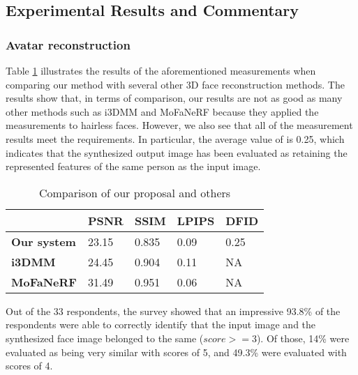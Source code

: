 \subsection{Experimental Results and Commentary}
\subsubsection{Avatar reconstruction}

Table \ref{loss_stats} illustrates the results of the aforementioned measurements when comparing our method with several other 3D face reconstruction methods. The results show that, in terms of comparison, our results are not as good as many other methods such as i3DMM and MoFaNeRF because they applied the measurements to hairless faces. However, we also see that all of the measurement results meet the requirements. In particular, the average value of  is 0.25, which indicates that the synthesized output image has been evaluated as retaining the represented features of the same person as the input image.

\begin{table}[H]
    \centering
    \captionsetup{font=bf}
    \caption{Comparison of our proposal and others}
    \begin{tabularx}{\linewidth}{| X | X | X | X | X |}
        \hline
                            & \textbf{PSNR} & \textbf{SSIM} & \textbf{LPIPS} & \textbf{DFID} \\ \hline\hline
        \textbf{Our system} & 23.15         & 0.835         & 0.09           & 0.25          \\ \hline %
        \textbf{i3DMM}      & 24.45         & 0.904         & 0.11           & NA            \\ \hline
        \textbf{MoFaNeRF}   & 31.49         & 0.951         & 0.06           & NA            \\ \hline
    \end{tabularx}
    \label{loss_stats}
\end{table}

Out of the 33 respondents, the survey showed that an impressive 93.8\% of the respondents were able to correctly identify that the input image and the synthesized face image belonged to the same  ($score >= 3$). Of those, 14\% were evaluated as being very similar with scores of 5, and 49.3\% were evaluated with scores of 4. %

